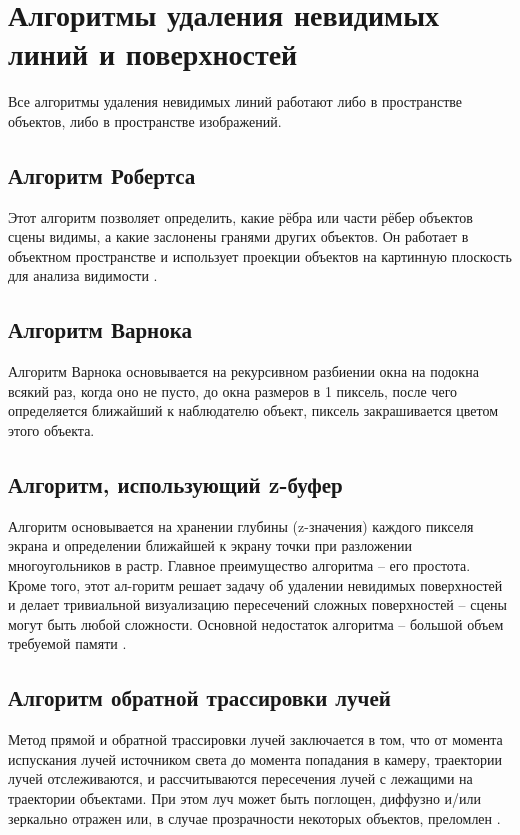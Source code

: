 \section{Алгоритмы удаления невидимых линий и поверхностей}
Все алгоритмы удаления невидимых линий работают либо в пространстве объектов, либо в пространстве изображений.
\subsection{Алгоритм Робертса}
Этот алгоритм позволяет определить, какие рёбра или части рёбер объектов сцены видимы, а какие заслонены гранями других объектов. Он работает в объектном пространстве и использует проекции объектов на картинную плоскость для анализа видимости \cite{lit2}. 

\subsection{Алгоритм Варнока}
Алгоритм Варнока основывается на рекурсивном разбиении окна на подокна всякий раз, когда оно не пусто, до окна размеров в 1 пиксель, после чего определяется ближайший к наблюдателю объект, пиксель закрашивается цветом этого объекта.

\subsection{Алгоритм, использующий z-буфер}

Алгоритм основывается на хранении глубины (z-значения) каждого пикселя экрана и определении ближайшей к экрану точки при разложении многоугольников в растр.
Главное преимущество алгоритма -- его простота. Кроме того, этот ал-горитм решает задачу об удалении невидимых поверхностей и делает тривиальной визуализацию пересечений сложных поверхностей -- сцены могут быть любой сложности.
Основной недостаток алгоритма -- большой объем требуемой памяти \cite{lit3}.


\subsection{Алгоритм обратной трассировки лучей}
Метод прямой и обратной трассировки лучей заключается в том, что от момента испускания лучей источником света до момента попадания в камеру, траектории лучей отслеживаются, и рассчитываются пересечения лучей с лежащими на траектории объектами. При этом луч может быть поглощен, диффузно и/или зеркально отражен или, в случае прозрачности некоторых объектов, преломлен \cite{lit4}.

